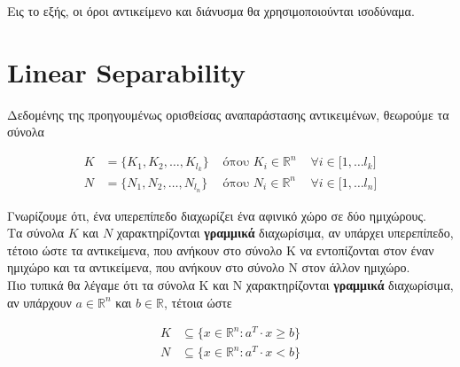 \documentclass[12pt]{article}
\newcommand{\R}{\mathbb{R}}
\newcommand{\margin}{\hspace{4pt}}
\begin{document}
Εις το εξής, οι όροι αντικείμενο και διάνυσμα θα χρησιμοποιούνται ισοδύναμα. \\

\pagebreak

\section{Linear Separability}

Δεδομένης της προηγουμένως ορισθείσας αναπαράστασης αντικειμένων, θεωρούμε τα σύνολα

\begin{align*}
    K & = \{K_{1}, K_{2}, \dotsc , K_{l_k}\} & \text{ όπου }  K_i \in \R^{n} & \margin \forall i \in \lbrack 1, \dotsc l_k \rbrack \\
    N & = \{N_{1}, N_{2}, \dotsc , N_{l_n}\} & \text{ όπου }  N_i \in \R^{n} & \margin \forall i \in \lbrack 1, \dotsc l_n \rbrack
\end{align*}

Γνωρίζουμε ότι, ένα υπερεπίπεδο διαχωρίζει ένα αφινικό χώρο σε δύο ημιχώρους. \\

Τα σύνολα \( K \) και \( N \) χαρακτηρίζονται \textbf{γραμμικά} διαχωρίσιμα,
αν υπάρχει υπερεπίπεδο, τέτοιο ώστε τα αντικείμενα,
που ανήκουν στο σύνολο Κ να εντοπίζονται στον έναν ημιχώρο και τα αντικείμενα,
που ανήκουν στο σύνολο N στον άλλον ημιχώρο. \\

Πιο τυπικά θα λέγαμε ότι τα σύνολα Κ και N χαρακτηρίζονται \textbf{γραμμικά} διαχωρίσιμα,
αν υπάρχουν \( a \in \R^{n} \) και \( b \in \R \), τέτοια ώστε

\begin{align*}
    K & \subseteq \{ x \in \R^{n} : a^{T} \cdot x \geq b \} \\
    N & \subseteq \{ x \in \R^{n} : a^{T} \cdot x < b\}
\end{align*}
\end{document}
